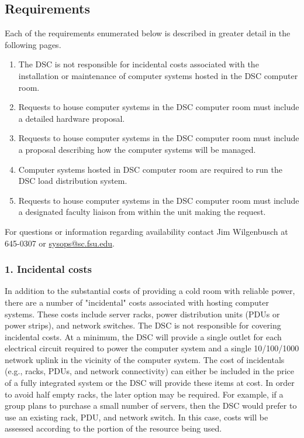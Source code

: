 \documentclass[12pt,a4paper]{article}
\begin{document}
\subsection*{Requirements}
Each of the requirements enumerated below is described in greater detail in the following pages.
\begin{enumerate}
    \item The DSC is not responsible for incidental costs associated with the installation or maintenance of computer systems hosted in the DSC computer room.
    \item Requests to house computer systems in the DSC computer room must include a detailed hardware proposal.
    \item Requests to house computer systems in the DSC computer room must include a proposal describing how the computer systems will be managed.
    \item Computer systems hosted in DSC computer room are required to run the DSC load distribution system.
    \item Requests to house computer systems in the DSC computer room must include a designated faculty liaison from within the unit making the request.
\end{enumerate}
For questions or information regarding availability contact Jim Wilgenbusch at 645-0307 or \href{mailto:sysops@sc.fsu.edu}{sysops@sc.fsu.edu}.

\subsubsection*{1. Incidental costs}
In addition to the substantial costs of providing a cold room with reliable power, there are a number of "incidental" costs associated with hosting computer systems. These costs include server racks, power distribution units (PDUs or power strips), and network switches. The DSC is not responsible for covering incidental costs. At a minimum, the DSC will provide a single outlet for each electrical circuit required to power the computer system and a single 10/100/1000 network uplink in the vicinity of the computer system. The cost of incidentals (e.g., racks, PDUs, and network connectivity) can either be included in the price of a fully integrated system or the DSC will provide these items at cost. In order to avoid half empty racks, the later option may be required. For example, if a group plans to purchase a small number of servers, then the DSC would prefer to use an existing rack, PDU, and network switch. In this case, costs will be assessed according to the portion of the resource being used.
\end{document}
